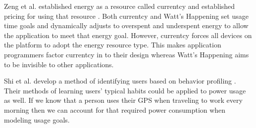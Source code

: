 Zeng et al. established energy as a resource called currentcy and established pricing for using that resource \cite{Zeng:2003:CUA:1247340.1247344}. 
Both currentcy and Watt's Happening set usage time goals and dynamically adjusts to overspent and underspent energy to allow the application to meet that energy goal. 
However, currentcy forces all devices on the platform to adopt the energy resource type. 
This makes application programmers factor currentcy in to their design whereas Watt's Happening aims to be invisible to other applications. 

Shi et al. develop a method of identifying users based on behavior profiling \cite{learningUserBehavior}. 
Their methods of learning users' typical habits could be applied to power usage as well. 
If we know that a person uses their GPS when traveling to work every morning then we can account for that required power consumption when modeling usage goals. 


%
% 	
% 
